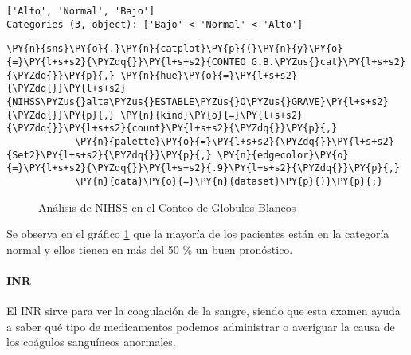             \begin{tcolorbox}[breakable, size=fbox, boxrule=.5pt, pad at break*=1mm, opacityfill=0]
\begin{Verbatim}[commandchars=\\\{\}]
['Alto', 'Normal', 'Bajo']
Categories (3, object): ['Bajo' < 'Normal' < 'Alto']
\end{Verbatim}
\end{tcolorbox}
        
    \begin{tcolorbox}[breakable, size=fbox, boxrule=1pt, pad at break*=1mm,colback=cellbackground, colframe=cellborder]
\begin{Verbatim}[commandchars=\\\{\}]
\PY{n}{sns}\PY{o}{.}\PY{n}{catplot}\PY{p}{(}\PY{n}{y}\PY{o}{=}\PY{l+s+s2}{\PYZdq{}}\PY{l+s+s2}{CONTEO G.B.\PYZus{}cat}\PY{l+s+s2}{\PYZdq{}}\PY{p}{,} \PY{n}{hue}\PY{o}{=}\PY{l+s+s2}{\PYZdq{}}\PY{l+s+s2}{NIHSS\PYZus{}alta\PYZus{}ESTABLE\PYZus{}O\PYZus{}GRAVE}\PY{l+s+s2}{\PYZdq{}}\PY{p}{,} \PY{n}{kind}\PY{o}{=}\PY{l+s+s2}{\PYZdq{}}\PY{l+s+s2}{count}\PY{l+s+s2}{\PYZdq{}}\PY{p}{,}
            \PY{n}{palette}\PY{o}{=}\PY{l+s+s2}{\PYZdq{}}\PY{l+s+s2}{Set2}\PY{l+s+s2}{\PYZdq{}}\PY{p}{,} \PY{n}{edgecolor}\PY{o}{=}\PY{l+s+s2}{\PYZdq{}}\PY{l+s+s2}{.9}\PY{l+s+s2}{\PYZdq{}}\PY{p}{,}
            \PY{n}{data}\PY{o}{=}\PY{n}{dataset}\PY{p}{)}\PY{p}{;}
\end{Verbatim}
\end{tcolorbox}

\begin{center}
    	\begin{figure}[H]
	\centering
	\caption{Análisis de NIHSS en el Conteo de Globulos Blancos}
	\label{fig:aNISScg}
	\end{figure}
\end{center}
    
    Se observa en el gráfico \ref{fig:aNISScg} que la mayoría de los pacientes están en la
categoría normal y ellos tienen en más del 50 \% un buen pronóstico.

    \hypertarget{inr}{%
\paragraph{INR}\label{inr}}

El INR sirve para ver la coagulación de la sangre, siendo que esta
examen ayuda a saber qué tipo de medicamentos podemos administrar o
averiguar la causa de los coágulos sanguíneos anormales.

